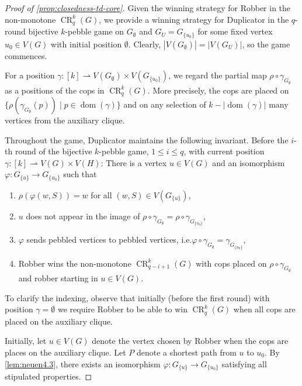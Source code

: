 \documentclass[a4paper,UKenglish,cleveref, autoref, thm-restate]{lipics-v2021}
\renewcommand{\phi}{\varphi}
\DeclareMathOperator{\CR}{CR}
\DeclareMathOperator{\dom}{dom}
\begin{document}
\begin{proof}[Proof of \cref{prop:closedness-td-core}]
	Given the winning strategy for Robber in the non-monotone $\CR^k_q(G)$, we provide a winning strategy for Duplicator in the $q$-round bijective $k$-pebble game on $G_\emptyset$ and $G_U = G_{\{u_0\}}$ for some fixed vertex $u_0 \in V(G)$ with initial position $\emptyset$. Clearly, $|V(G_\emptyset)| = |V(G_U)|$, so the game commences.

	For a position $\gamma \colon [k] \rightharpoonup V(G_\emptyset) \times V(G_{\{u_0\}})$, we regard the partial map $\rho \circ \gamma_{G_\emptyset}$ as a positions of the cops in $\CR^k_q(G)$. More precisely, the cops are placed on $\{\rho(\gamma_{G_\emptyset}(p)) \mid p \in \dom(\gamma)\}$ and on any selection of $k - |\dom(\gamma)|$ many  vertices from the auxiliary clique.

		
	Throughout the game, Duplicator maintains the following invariant. Before the $i$-th round of the bijective $k$-pebble game, $1 \leq i \leq q$, with current position $\gamma \colon [k] \rightharpoonup V(G) \times V(H)$:
	There is a vertex $u \in V(G)$ and an isomorphism $\phi \colon G_{\{u\}} \to G_{\{u_0\}}$ such that
	\begin{enumerate}[I]
		\item $\rho(\phi(w, S)) = w$ for all $(w, S) \in V(G_{\{u\}})$,\label{inv1}
		\item $u$ does not appear in the image of $\rho \circ \gamma_{G_\emptyset} = \rho \circ \gamma_{G_{\{u_0\}}}$,\label{inv2}
		\item $\phi$ sends pebbled vertices to pebbled vertices, i.e.\@ $\phi \circ \gamma_{G_\emptyset} = \gamma_{G_{\{u_0\}}}$,\label{inv3}
		\item Robber wins the non-monotone $\CR^k_{q-i+1}(G)$ with cops placed on $\rho \circ \gamma_{G_\emptyset}$ and robber starting in $u \in V(G)$.\label{inv4}
	\end{enumerate}

	To clarify the indexing, observe that initially (before the first round) with position $\gamma = \emptyset$ we require Robber to be able to win $\CR^k_q(G)$ when all cops are placed on the auxiliary clique.

	Initially, let $u \in V(G)$ denote the vertex chosen by Robber when the cops are places on the auxiliary clique. 
	Let $P$ denote a shortest path from $u$ to $u_0$.
	By \cref{lem:neuen4.3}, there exists an isomorphism $\phi \colon G_{\{u\}} \to G_{\{u_0\}}$ satisfying all stipulated properties.
	

\end{proof}
\end{document}
